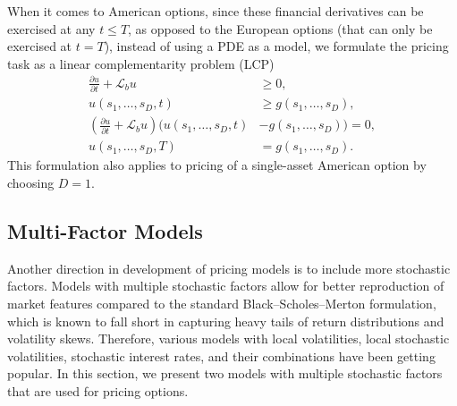 \documentclass{UUThesisTemplate}
\begin{document}
\par
When it comes to American options, since these financial derivatives can be exercised at any $t \leq T$, as opposed to the European options (that can only be exercised at $t=T$), instead of using a PDE as a model, we formulate the pricing task as a linear complementarity problem (LCP)
\begin{align}
\frac{\partial u}{\partial t}+\mathcal{L}_b u&\geq 0,\nonumber \\
u(s_1,\ldots, s_D,t)&\geq g(s_1,\ldots, s_D), \nonumber \\
\left( \frac{\partial u}{\partial t}+\mathcal{L}_b u\right) \big(u(s_1,\ldots, s_D,t) &-g(s_1,\ldots, s_D)\big)=0, \nonumber \\ 
u(s_1,\ldots,s_D,T)&=g(s_1,\ldots,s_D). \label{eqlcp}
\end{align}
This formulation also applies to pricing of a single-asset American option by choosing $D=1$. 
%



%
\subsection{Multi-Factor Models}
\label{sub:multifactor}

\par
Another direction in development of pricing models is to include more stochastic factors. Models with multiple stochastic factors allow for better reproduction of market features compared to the standard Black--Scholes--Merton formulation, which is known to fall short in capturing heavy tails of return distributions and volatility skews. Therefore, various models with local volatilities, local stochastic volatilities, stochastic interest rates, and their combinations have been getting popular. In this section, we present two models with multiple stochastic factors that are used for pricing options.
\end{document}
